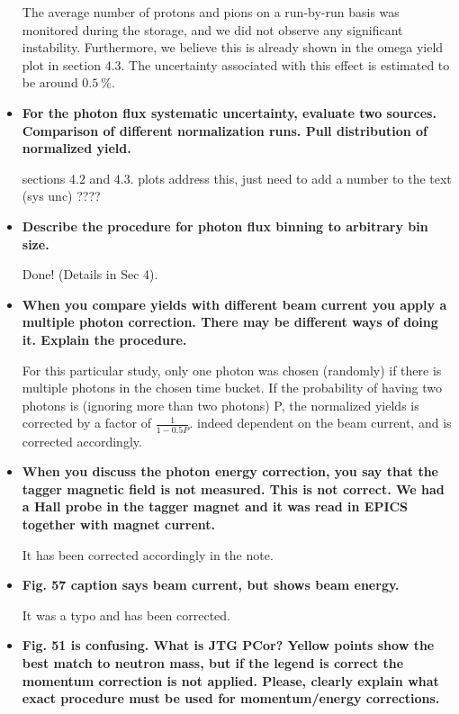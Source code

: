 \documentclass[ 12 pt]{article}
\begin{document}
\begin{itemize}
The average number of protons and pions on a run-by-run basis was monitored during the storage, and we did not observe any significant instability. Furthermore, we believe this is already shown in the omega yield plot in section 4.3. The uncertainty associated with this effect is estimated to be around $0.5~\%$.

\item \textbf{For the photon flux systematic uncertainty, evaluate two sources.\\
Comparison of different normalization runs.
Pull distribution of normalized yield.}

sections 4.2 and 4.3. plots address this, just need to add a number to the text (sys unc) ????

\item \textbf{Describe the procedure for photon flux binning to arbitrary bin size.}

Done! (Details in Sec 4).


\item \textbf{When you compare yields with different beam current you apply a multiple
photon correction. There may be different ways of doing it. Explain the
procedure.}

For this particular study, only one photon was chosen (randomly) if there is multiple photons in the chosen time bucket. If the probability of having two photons is (ignoring more than two photons) P, the normalized yields is corrected by a factor of $\frac{1}{1-0.5P}$. indeed dependent on the beam current, and is corrected accordingly.

\item \textbf{When you discuss the photon energy correction, you say that the tagger
magnetic field is not measured. This is not correct. We had a Hall probe in the
tagger magnet and it was read in EPICS together with magnet current.}

It has been corrected accordingly in the note.

\item  \textbf{Fig. 57 caption says beam current, but shows beam energy.}

It was a typo and has been corrected.

\item \textbf{Fig. 51 is confusing. What is JTG PCor? Yellow points show the best match to
neutron mass, but if the legend is correct the momentum correction is not
applied. Please, clearly explain what exact procedure must be used for
momentum/energy corrections.}


\end{itemize}
\end{document}
